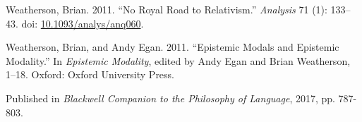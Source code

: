 \documentclass[
  11pt,
  letterpaper,
  DIV=11,
  numbers=noendperiod,
  twoside]{scrartcl}
\newlength{\cslhangindent}
\newenvironment{CSLReferences}[2] %
 {\begin{list}{}{%
  \setlength{\itemindent}{0pt}
  \setlength{\leftmargin}{0pt}
  \setlength{\parsep}{0pt}
  \ifodd #1
   \setlength{\leftmargin}{\cslhangindent}
   \setlength{\itemindent}{-1\cslhangindent}
  \fi
  \setlength{\itemsep}{#2\baselineskip}}}
 {\end{list}}
\begin{document}
\begin{CSLReferences}{1}{0}
Weatherson, Brian. 2011. {``No Royal Road to Relativism.''}
\emph{Analysis} 71 (1): 133--43. doi:
\href{https://doi.org/10.1093/analys/anq060}{10.1093/analys/anq060}.

Weatherson, Brian, and Andy Egan. 2011. {``Epistemic Modals and
Epistemic Modality.''} In \emph{Epistemic Modality}, edited by Andy Egan
and Brian Weatherson, 1--18. Oxford: Oxford University Press.

\end{CSLReferences}



\noindent Published in\emph{
Blackwell Companion to the Philosophy of Language}, 2017, pp. 787-803.
\end{document}
